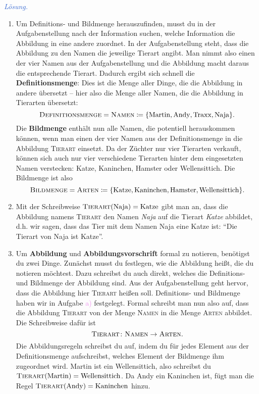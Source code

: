 \documentclass[../abbildungen.tex]{subfiles}
\begin{document}
    \textcolor{highlight}{\emph{Lösung.}} 
    \begin{enumerate}[label=\textcolor{highlight}{\alph*)}]
        \item Um Definitions- und Bildmenge herauszufinden, musst du in der Aufgabenstellung nach der Information suchen, welche Information die Abbildung in eine andere zuordnet. In der Aufgabenstellung steht, dass die Abbildung zu den Namen die jeweilige Tierart angibt. Man nimmt also einen der vier Namen aus der Aufgabenstellung und die Abbildung macht daraus die entsprechende Tierart. Dadurch ergibt sich schnell die \textbf{Definitionsmenge}: Dies ist die Menge aller Dinge, die die Abbildung in andere übersetzt -- hier also die Menge aller Namen, die die Abbildung in Tierarten übersetzt:
        \[\textsc{Definitionsmenge}=\textsc{Namen}\coloneqq\{\text{Martin}, \text{Andy}, \text{Traxx}, \text{Naja}\}.\]
        Die \textbf{Bildmenge} enthält nun alle Namen, die potentiell herauskommen können, wenn man einen der vier Namen aus der Definitionsmenge in die Abbildung \textsc{Tierart} einsetzt. Da der Züchter nur vier Tierarten verkauft, können sich auch nur vier verschiedene Tierarten hinter dem eingesetzten Namen verstecken: Katze, Kaninchen, Hamster oder Wellensittich. Die Bildmenge ist also
        \[\textsc{Bildmenge}=\textsc{Arten}\coloneqq\{\text{Katze}, \text{Kaninchen}, \text{Hamster}, \text{Wellensittich}\}.\]
        
        \item Mit der Schreibweise $\textsc{Tierart}(\text{Naja})=\text{Katze}$ gibt man an, dass die Abbildung namens \textsc{Tierart} den Namen \emph{Naja} auf die Tierart \emph{Katze} abbildet, d.h. wir sagen, dass das Tier mit dem Namen Naja eine Katze ist: \enquote{Die Tierart von Naja ist Katze}.
        
        \item Um \textbf{Abbildung} und \textbf{Abbildungsvorschrift} formal zu notieren, benötigst du zwei Dinge. Zunächst musst du festlegen, wie die Abbildung heißt, die du notieren möchtest. Dazu schreibst du auch direkt, welches die Definitions- und Bildmenge der Abbildung sind. Aus der Aufgabenstellung geht hervor, dass die Abbildung hier \textsc{Tierart} heißen soll. Definitions- und Bildmenge haben wir in Aufgabe \textcolor{violet}{a)} festgelegt. Formal schreibt man nun also auf, dass die Abbildung \textsc{Tierart} von der Menge \textsc{Namen} in die Menge \textsc{Arten} abbildet. Die Schreibweise dafür ist
        \[\textsc{Tierart}\colon\textsc{Namen}\rightarrow\textsc{Arten}.\]
        Die Abbildungsregeln schreibst du auf, indem du für jedes Element aus der Definitionsmenge aufschreibst, welches Element der Bildmenge ihm zugeordnet wird. Martin ist ein Wellensittich, also schreibst du $\textsc{Tierart}(\text{Martin})=\text{Wellensittich}$. Da Andy ein Kaninchen ist, fügt man die Regel $\textsc{Tierart}(\text{Andy})=\text{Kaninchen}$ hinzu.
        

\end{enumerate}
\end{document}
